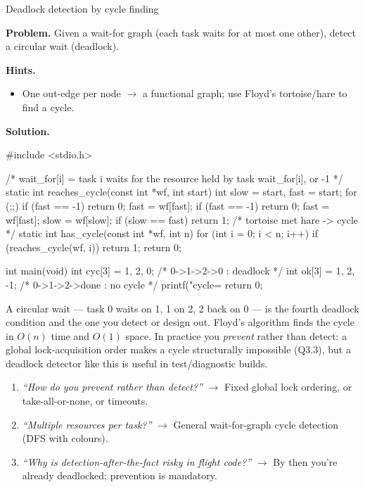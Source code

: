 \begin{gymproblem}{Deadlock detection by cycle finding}

\textbf{Problem.} Given a wait-for graph (each task waits for at most one other),
detect a circular wait (deadlock).

\textbf{Hints.}
\begin{itemize}
\item One out-edge per node $\rightarrow$ a functional graph; use Floyd's
  tortoise/hare to find a cycle.
\end{itemize}

\attempt

\textbf{Solution.}
\begin{cgym}
#include <stdio.h>

/* wait_for[i] = task i waits for the resource held by task wait_for[i], or -1 */
static int reaches_cycle(const int *wf, int start) {
    int slow = start, fast = start;
    for (;;) {
        if (fast == -1) return 0;
        fast = wf[fast];
        if (fast == -1) return 0;
        fast = wf[fast];
        slow = wf[slow];
        if (slow == fast) return 1;     /* tortoise met hare -> cycle */
    }
}
static int has_cycle(const int *wf, int n) {
    for (int i = 0; i < n; i++) if (reaches_cycle(wf, i)) return 1;
    return 0;
}

int main(void) {
    int cyc[3] = {1, 2, 0};     /* 0->1->2->0 : deadlock */
    int ok[3]  = {1, 2, -1};    /* 0->1->2->done : no cycle */
    printf("cycle=%
    return 0;
}
\end{cgym}

A circular wait --- task 0 waits on 1, 1 on 2, 2 back on 0 --- is the fourth
deadlock condition and the one you detect or design out. Floyd's algorithm finds
the cycle in $O(n)$ time and $O(1)$ space. In practice you \emph{prevent} rather
than detect: a global lock-acquisition order makes a cycle structurally
impossible (Q3.3), but a deadlock detector like this is useful in test/diagnostic
builds.

\followups
\begin{enumerate}
\item \emph{``How do you prevent rather than detect?''} $\rightarrow$ Fixed
  global lock ordering, or take-all-or-none, or timeouts.
\item \emph{``Multiple resources per task?''} $\rightarrow$ General
  wait-for-graph cycle detection (DFS with colours).
\item \emph{``Why is detection-after-the-fact risky in flight code?''}
  $\rightarrow$ By then you're already deadlocked; prevention is mandatory.
\end{enumerate}
\end{gymproblem}


